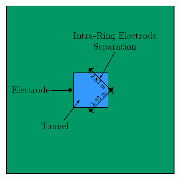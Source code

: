 \documentclass[preprint,authoryear,12pt]{elsarticle}
\begin{document}
\begin{figure}[htp]{}
\begin{center}
      \begin{subfigure}{0.56\linewidth}
         \label{fig:ElectrodeSpacing_StraightTunnel_Layout_Ring_X}
         \includegraphics[height=\ht0,keepaspectratio]{./figures/Fig7a.pdf}
      \end{subfigure}
      \hspace{-2.5cm}
      \begin{subfigure}{0.56\linewidth}

\end{subfigure}
\end{center}
\end{figure}
\end{document}
